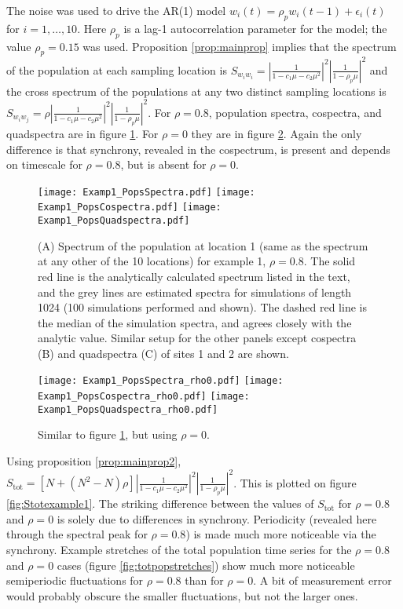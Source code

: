 \documentclass[letterpaper,11pt]{article}
\begin{document}
The noise was used to drive the AR(1) model $w_i(t)=\rho_p w_i(t-1)+\epsilon_i(t)$
for $i=1,\ldots,10$. Here $\rho_p$ is a lag-1 autocorrelation parameter for the model;
the value $\rho_p=0.15$ was used. Proposition \ref{prop:mainprop} implies
that the spectrum of the population at each sampling location is
$S_{w_i w_i} = \left| \frac{1}{1-c_1 \mu -c_2 \mu^2} \right|^2
\left| \frac{1}{1-\rho_p \mu} \right|^2$ and the cross spectrum of the populations
at any two distinct sampling locations is 
$S_{w_i w_j} = \rho \left| \frac{1}{1-c_1 \mu -c_2 \mu^2} \right|^2 
\left| \frac{1}{1-\rho_p \mu} \right|^2$.
For $\rho=0.8$,
population spectra, cospectra, and quadspectra are in figure \ref{fig:example1_pops_spectra_rho0p8}.
For $\rho=0$ they are in figure \ref{fig:example1_pops_spectra_rho0}.
Again the only difference is that synchrony, revealed in the cospectrum,
is present and depends on timescale for $\rho=0.8$, but is absent for 
$\rho=0$.

\begin{figure}
\texttt{[image: Examp1\_PopsSpectra.pdf]}
\texttt{[image: Examp1\_PopsCospectra.pdf]}
\texttt{[image: Examp1\_PopsQuadspectra.pdf]}
\caption{(A) Spectrum of the population at location 1 (same as the spectrum at any other of the 10 locations) for example 1, $\rho=0.8$. The solid red line is the analytically calculated spectrum listed in the text, and the grey lines are estimated spectra for simulations of length 1024 (100 simulations performed and shown). The dashed red line is the median of the simulation spectra, and agrees closely with the analytic value. Similar setup for
 the other panels except cospectra (B) and quadspectra (C) of sites 1 and 2 are shown. }\label{fig:example1_pops_spectra_rho0p8}
\end{figure}

\begin{figure}
\texttt{[image: Examp1\_PopsSpectra\_rho0.pdf]}
\texttt{[image: Examp1\_PopsCospectra\_rho0.pdf]}
\texttt{[image: Examp1\_PopsQuadspectra\_rho0.pdf]}
\caption{Similar to figure \ref{fig:example1_pops_spectra_rho0p8}, but using $\rho=0$.}\label{fig:example1_pops_spectra_rho0}
\end{figure}

Using proposition \ref{prop:mainprop2}, $S_{\text{tot}} = 
\left[N + (N^2-N)\rho \right] \left| \frac{1}{1-c_1 \mu - c_2 \mu^2} \right|^2  
\left| \frac{1}{1-\rho_p \mu} \right|^2$. This is plotted on figure
\ref{fig:Stotexample1}. The striking difference between the values of 
$S_{\text{tot}}$ for $\rho=0.8$ and $\rho=0$ is solely due to 
differences in synchrony. Periodicity (revealed here through the spectral peak for
$\rho=0.8$) is made much more noticeable via the synchrony. Example
stretches of the total population time series for the $\rho=0.8$ and 
$\rho=0$ cases (figure \ref{fig:totpopstretches}) show much
more noticeable semiperiodic fluctuations for $\rho=0.8$ than for 
$\rho=0$. A bit of measurement error would probably obscure the smaller fluctuations,
but not the larger ones.
\end{document}
